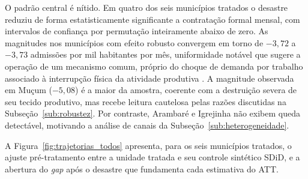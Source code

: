 \documentclass[a4paper,12pt]{article}
\begin{document}
O padrão central é nítido. Em quatro dos seis municípios tratados o desastre
reduziu de forma estatisticamente significante a contratação formal mensal,
com intervalos de confiança por permutação inteiramente abaixo de zero. As
magnitudes nos municípios com efeito robusto convergem em torno de
$-3{,}72$ a $-3{,}73$ admissões por mil habitantes por mês, uniformidade
notável que sugere a operação de um mecanismo comum, próprio do choque de
demanda por trabalho associado à interrupção física da atividade produtiva
\cite{haddad2015economic}. A magnitude observada em Mu\c{c}um ($-5{,}08$) é a maior
da amostra, coerente com a destruição severa de seu tecido produtivo, mas
recebe leitura cautelosa pelas razões discutidas na
Subseção~\ref{sub:robustez}. Por contraste, Arambaré e Igrejinha não exibem
queda detectável, motivando a análise de canais da
Subseção~\ref{sub:heterogeneidade}.

A Figura~\ref{fig:trajetorias_todos} apresenta, para os seis municípios
tratados, o ajuste pré-tratamento entre a unidade tratada e seu controle
sintético SDiD, e a abertura do \textit{gap} após o desastre que fundamenta
cada estimativa do ATT.
\end{document}
